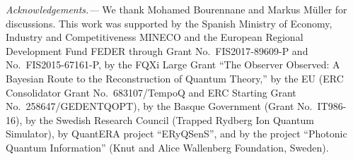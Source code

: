 \documentclass[
aps,prl,
reprint,
a4paper,
superscriptaddress,
floatfix,
]{revtex4-1}
\begin{document}
{\em Acknowledgements.---}
We thank Mohamed Bourennane and Markus Müller for discussions.
This work was supported by
the Spanish Ministry of Economy, Industry and Competitiveness MINECO and
the European Regional Development Fund FEDER through Grant No.\ FIS2017-89609-P 
 and No.\ FIS2015-67161-P,
by the FQXi Large Grant ``The Observer Observed: A Bayesian Route to the 
Reconstruction of Quantum Theory,''
by the EU (ERC Consolidator Grant No.\ 683107/TempoQ and
ERC Starting Grant No.\ 258647/GEDENTQOPT),
by the Basque Government (Grant No.\ IT986-16), by the Swedish Research Council (Trapped Rydberg Ion Quantum Simulator), by QuantERA project ``ERyQSenS'',
and by the project ``Photonic Quantum Information'' (Knut and Alice Wallenberg 
Foundation, Sweden).
\end{document}
